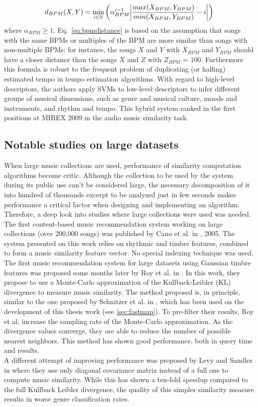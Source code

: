 \begin{equation}
d_{BPM}(X,Y) = \min_{i \in \mathbb{N}} \left( \alpha_{BPM}^{i-1} \abs*{\frac{max(X_{BPM}, Y_{BPM})}{min(X_{BPM}, Y_{BPM})} - i} \right)
\label{eq:bpmdistance}
\end{equation}
where $\alpha_{BPM} \geq 1$. Eq.~\ref{eq:bpmdistance} is based on the assumption that songs with the same BPMs or multiples of the BPM are more similar than songs with non-multiple BPMs; for instance, the songs $X$ and $Y$ with $X_{BPM}$ and $Y_{BPM}$ should have a closer distance than the songs $X$ and $Z$ with $Z_{BPM}$ = 100. Furthermore this formula is robust to the frequent problem of duplicating (or halfing) estimated tempo in tempo estimation algorithms. With regard to high-level descriptors, the authors apply SVMs to low-level descriptors to infer different groups of musical dimensions, such as genre and musical culture, moods and instruments, and rhythm and tempo. This hybrid system ranked in the first positions at MIREX 2009 in the audio music similarity task. 

\subsection*{Notable studies on large datasets}
When large music collections are used, performance of similarity computation algorithms become critic. Although the collection to be used by the system during its public use can't be considered large, the necessary decomposition of it into hundred of thousands excerpt to be analyzed just in few seconds makes performance a critical factor when designing and implementing an algorithm. Therefore, a deep look into studies where large collections were used was needed.\\
The first content-based music recommendation system working on large collections (over 200,000 songs) was published by Cano et al. in \cite{cano05}, 2005. The system presented on this work relies on rhythmic and timbre features, combined to form a music similarity feature vector. No special indexing technique was used. \\
The first music recommendation system for large datasets using Gaussian timbre features was proposed some months later by Roy et al. in \cite{roy05}. In this work, they propose to use a Monte-Carlo approximation of the Kullback-Leibler (KL) divergence to measure music similarity. The method proposed is, in principle, similar to the one proposed by Schnitzer et al. in \cite{fastmap12}, which has been used on the development of this thesis work (see \ref{sec:fastmap}). To pre-filter their results, Roy et al. increase the sampling rate of the Monte-Carlo approximation. As the divergence values converge, they are able to reduce the number of possible nearest neighbors. This method has shown good performance, both in query time and results.\\
A different attempt of improving performance was proposed by Levy and Sandler in \cite{levy06} where they use only diagonal covariance matrix instead of a full one to compute music similarity. While this has shown a ten-fold speedup compared to the full Kullback Leibler divergence, the quality of this simpler similarity measure results in worse genre classification rates. 


